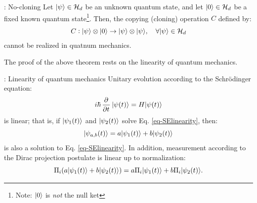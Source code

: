 \begin{thmbox}{: No-cloning}
    Let $\lvert \psi \rangle \in \mathcal{H}_d$ be an unknown quantum state, and let $\lvert 0 \rangle \in \mathcal{H}_d$ be a fixed known quantum state\footnote{Note: $\lvert 0 \rangle$ is \emph{not} the null ket}. Then, the copying (cloning) operation $C$ defined by:
    \begin{equation}
        C: \lvert \psi \rangle \otimes \lvert 0 \rangle \to \lvert \psi \rangle \otimes \lvert \psi \rangle, \quad \forall \lvert \psi \rangle \in \mathcal{H}_d
    \end{equation}
    cannot be realized in quatnum mechanics.
\end{thmbox}

The proof of the above theorem rests on the linearity of quantum mechanics.

\begin{lembox}{: Linearity of quantum mechanics}
    Unitary evolution according to the Schr\"{o}dinger equation:
    \begin{equation}\label{eq-SElinearity}
        i\hbar\dpd{}{t}\ket{\psi(t)} = H\ket{\psi(t)}
    \end{equation}
    is linear; that is, if $\lvert \psi_1(t) \rangle$ and $\lvert \psi_2(t) \rangle$ solve Eq. \eqref{eq-SElinearity}, then:
    \begin{equation}
        \lvert \psi_{a, b}(t) \rangle = a\lvert \psi_1(t) \rangle + b\lvert \psi_2(t) \rangle
    \end{equation} 
    is also a solution to Eq. \eqref{eq-SElinearity}. In addition, measurement according to the Dirac projection postulate is linear up to normalization:
    \begin{equation}
        \Pi_i(a\lvert \psi_1(t) \rangle + b\lvert \psi_2(t) \rangle) = a\Pi_i\lvert \psi_1(t) \rangle + b\Pi_i\lvert \psi_2(t) \rangle.
    \end{equation}
\end{lembox}

